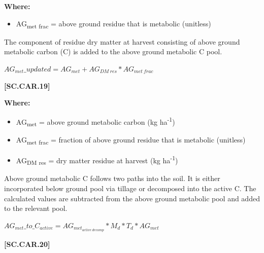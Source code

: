         \textbf{Where:}
            
        \begin{itemize}
            \item AG\textsubscript{met frac} = above ground residue that is metabolic (unitless)
        \end{itemize}
        \vspace{0.5cm}

The component of residue dry matter at harvest consisting of above ground metabolic carbon (C) is added to the above ground metabolic C pool.
                \vspace{0.5cm}

    \begin{center}
\(AG_{met}\_updated=AG_{met}+AG_{DM\ res} * AG_{met\ frac}\)
    \end{center}
        \vspace{0.5cm} 
    
            {\raggedleft \textbf{[SC.CAR.19]}\par}
            \vspace{0.5cm}

        \textbf{Where:}
            
        \begin{itemize}
            \item AG\textsubscript{met} = above ground metabolic carbon (kg ha\textsuperscript{-1})
            \item AG\textsubscript{met frac} = fraction of above ground residue that is metabolic (unitless)
            \item AG\textsubscript{DM res} = dry matter residue at harvest (kg ha\textsuperscript{-1})
        \end{itemize}
        \vspace{0.5cm}

Above ground metabolic C follows two paths into the soil. It is either incorporated below ground pool via tillage or decomposed into the active C. The calculated values are subtracted from the above ground metabolic pool and added to the relevant pool.
                \vspace{0.5cm}

    \begin{center}
\(AG_{met}\_to\_C_{active}=AG_{met_{active\ decomp}} * M_d *T_d * AG_{met}\)
    \end{center}
        \vspace{0.5cm} 
    
            {\raggedleft \textbf{[SC.CAR.20]}\par}
            \vspace{0.5cm}

